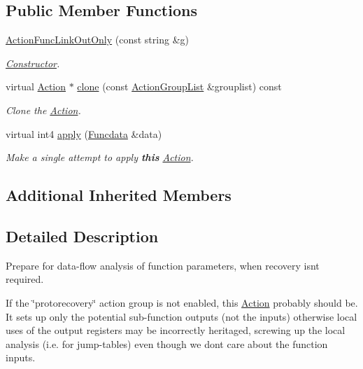 \subsection*{Public Member Functions}
\begin{DoxyCompactItemize}
\item 
\mbox{\hyperlink{class_action_func_link_out_only_a4c4097e870218f70d23a848a1e79fb78}{Action\+Func\+Link\+Out\+Only}} (const string \&g)
\begin{DoxyCompactList}\small\item\em \mbox{\hyperlink{class_constructor}{Constructor}}. \end{DoxyCompactList}\item 
virtual \mbox{\hyperlink{class_action}{Action}} $\ast$ \mbox{\hyperlink{class_action_func_link_out_only_aea7020b6da99752e4bf1b3edc3a5de53}{clone}} (const \mbox{\hyperlink{class_action_group_list}{Action\+Group\+List}} \&grouplist) const
\begin{DoxyCompactList}\small\item\em Clone the \mbox{\hyperlink{class_action}{Action}}. \end{DoxyCompactList}\item 
virtual int4 \mbox{\hyperlink{class_action_func_link_out_only_a68364ccae05a65b54188cd92c876d01f}{apply}} (\mbox{\hyperlink{class_funcdata}{Funcdata}} \&data)
\begin{DoxyCompactList}\small\item\em Make a single attempt to apply {\bfseries{this}} \mbox{\hyperlink{class_action}{Action}}. \end{DoxyCompactList}\end{DoxyCompactItemize}
\subsection*{Additional Inherited Members}


\subsection{Detailed Description}
Prepare for data-\/flow analysis of function parameters, when recovery isn\textquotesingle{}t required. 

If the \char`\"{}protorecovery\char`\"{} action group is not enabled, this \mbox{\hyperlink{class_action}{Action}} probably should be. It sets up only the potential sub-\/function outputs (not the inputs) otherwise local uses of the output registers may be incorrectly heritaged, screwing up the local analysis (i.\+e. for jump-\/tables) even though we don\textquotesingle{}t care about the function inputs. 

